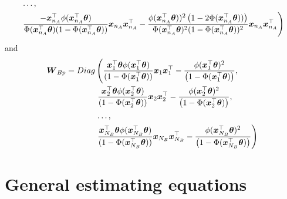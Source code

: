 \documentclass[
  letterpaper,
  DIV=11,
  numbers=noendperiod]{scrreprt}
\begin{document}
\[\begin{align}
    & \left. \ldots, \right.
    \\ 
    & \left. \frac{ - \boldsymbol{x}_{n_A}^{\top} \phi(\boldsymbol{x}_{n_A}^{\top}\boldsymbol{\theta})}{\Phi(\boldsymbol{x}_{n_A}^{\top}\boldsymbol{\theta})(1 - \Phi(\boldsymbol{x}_{n_A}^{\top}\boldsymbol{\theta}) )}\boldsymbol{x}_{n_A}\boldsymbol{x}_{n_A}^{\top} - \frac{\phi(\boldsymbol{x}_{n_A}^{\top}\boldsymbol{\theta}))^{2} \left(1 - 2\Phi(\boldsymbol{x}_{n_A}^{\top}\boldsymbol{\theta}))\right)}{\Phi(\boldsymbol{x}_{n_A}^{\top}\boldsymbol{\theta})^{2}(1 - \Phi(\boldsymbol{x}_{n_A}^{\top}\boldsymbol{\theta}) )^{2}}\boldsymbol{x}_{n_A}\boldsymbol{x}_{n_A}^{\top}\right)
\end{align}
\] and \[
\begin{align}
 \operatorname{\boldsymbol{W}}_{Bp} = Diag & \left(\frac{\boldsymbol{x}_1^{\top}\boldsymbol{\theta} \phi(\boldsymbol{x}_1^{\top}\boldsymbol{\theta})}{(1 -  \Phi(\boldsymbol{x}_1^{\top}\boldsymbol{\theta}))}\boldsymbol{x}_1\boldsymbol{x}_1^{\top} - \frac{\phi(\boldsymbol{x}_1^{\top}\boldsymbol{\theta})^{2}}{\left(1 - \Phi(\boldsymbol{x}_1^{\top}\boldsymbol{\theta}) \right)}, \right.
    \\
    & 
    \left. \frac{\boldsymbol{x}_2^{\top}\boldsymbol{\theta} \phi(\boldsymbol{x}_2^{\top}\boldsymbol{\theta})}{(1 -  \Phi(\boldsymbol{x}_2^{\top}\boldsymbol{\theta}))}\boldsymbol{x}_2\boldsymbol{x}_2^{\top} - \frac{\phi(\boldsymbol{x}_2^{\top}\boldsymbol{\theta})^{2}}{\left(1 - \Phi(\boldsymbol{x}_2^{\top}\boldsymbol{\theta}) \right)}, \right.
    \\
    & \left. \ldots, \right.
    \\
    & \left. \frac{\boldsymbol{x}_{N_B}^{\top}\boldsymbol{\theta} \phi(\boldsymbol{x}_{N_B}^{\top}\boldsymbol{\theta})}{(1 -  \Phi(\boldsymbol{x}_{N_B}^{\top}\boldsymbol{\theta}))}\boldsymbol{x}_{N_B}\boldsymbol{x}_{N_B}^{\top} - \frac{\phi(\boldsymbol{x}_{N_B}^{\top}\boldsymbol{\theta})^{2}}{\left(1 - \Phi(\boldsymbol{x}_{N_B}^{\top}\boldsymbol{\theta}) \right)}\right)
\end{align}
\]

\hypertarget{general-estimating-equations}{%
\section{General estimating
equations}\label{general-estimating-equations}}
\end{document}
